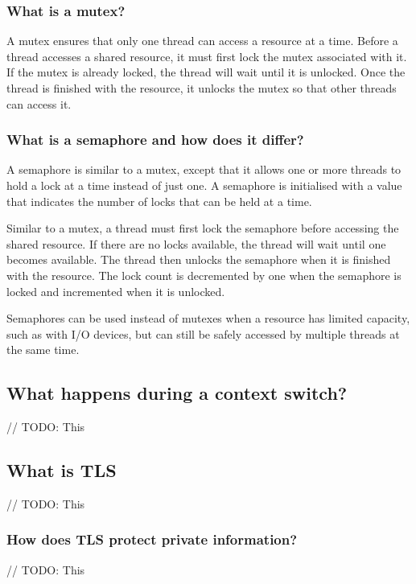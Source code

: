 \documentclass{article}
\begin{document}
    \subsubsection{What is a mutex?}
    A mutex ensures that only one thread can access a resource at a time.
    Before a thread accesses a shared resource, it must first lock the mutex associated with it.
    If the mutex is already locked, the thread will wait until it is unlocked.
    Once the thread is finished with the resource, it unlocks the mutex so that other
    threads can access it.

    \subsubsection{What is a semaphore and how does it differ?}
    A semaphore is similar to a mutex, except that it allows one or more threads to hold
    a lock at a time instead of just one. A semaphore is initialised with a value
    that indicates the number of locks that can be held at a time.

    Similar to a mutex, a thread must first lock the semaphore before accessing the shared resource.
    If there are no locks available, the thread will wait until one becomes available.
    The thread then unlocks the semaphore when it is finished with the resource.
    The lock count is decremented by one when the semaphore is locked and incremented
    when it is unlocked.

    Semaphores can be used instead of mutexes when a resource has limited capacity,
    such as with I/O devices, but can still be safely accessed by multiple threads at the same time.

\subsection{What happens during a context switch?}
// TODO: This

\subsection{What is TLS}
// TODO: This
    \subsubsection{How does TLS protect private information?}
    // TODO: This
\end{document}
